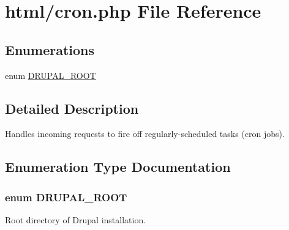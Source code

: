 \hypertarget{cron_8php}{
\section{html/cron.php File Reference}
\label{cron_8php}
}
\subsection*{Enumerations}
\begin{DoxyCompactItemize}
\item 
enum \hyperlink{cron_8php_a21cf187d162beffb1fbc5a1d1098f4f9}{DRUPAL\_\-ROOT} 
\end{DoxyCompactItemize}


\subsection{Detailed Description}
Handles incoming requests to fire off regularly-\/scheduled tasks (cron jobs). 

\subsection{Enumeration Type Documentation}
\hypertarget{cron_8php_a21cf187d162beffb1fbc5a1d1098f4f9}{
\subsubsection[{DRUPAL\_\-ROOT}]{\setlength{\rightskip}{0pt plus 5cm}enum {\bf DRUPAL\_\-ROOT}}}
\label{cron_8php_a21cf187d162beffb1fbc5a1d1098f4f9}
Root directory of Drupal installation. 
